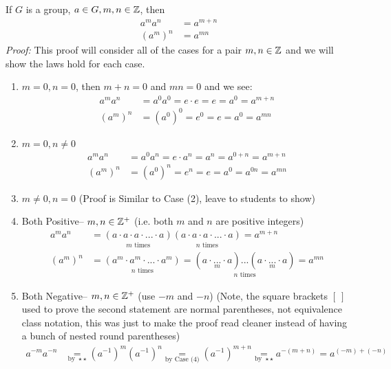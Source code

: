 \begin{proposition}
If $G$ is a group, $a\in G, m,n\in {\mathbb{Z}}$, then
\begin{align}
    a^m a^n&=a^{m+n} \nonumber \\
    (a^m)^n&= a^{mn} \nonumber
\end{align}
\textit{Proof:} This proof will consider all of the cases for a pair $m,n\in {\mathbb{Z}}$ and we will show
the laws hold for each case.
\begin{enumerate}[label=Case \arabic*:]
    \item $m=0,n=0$, then $m+n=0$ and $mn=0$ and we see:
    \begin{align}
        a^ma^n&=a^0a^0=e\cdot e=e=a^0=a^{m+n} \nonumber \\
        (a^m)^n&=(a^0)^0=e^0=e=a^0=a^{mn} \nonumber
    \end{align}
    \item $m=0, n\neq 0$
    \begin{align}
        a^ma^n&=a^0a^n=e\cdot a^n=a^n=a^{0+n}=a^{m+n} \nonumber \\
        (a^m)^n&=(a^0)^n=e^n=e=a^0=a^{0n}=a^{mn} \nonumber
    \end{align}
    \item $m\neq 0, n=0$ (Proof is Similar to Case (2), leave to students to show)
    \item Both Positive-- $m,n\in {\mathbb{Z}}^+$ (i.e. both $m$ and $n$ are positive integers)
    \begin{align}
        a^ma^n&=\underset{m\text{ times}}{(a\cdot a\cdot a \cdot ... \cdot a)}\underset{n \text{ times}}{(a\cdot a\cdot a \cdot ... \cdot a)}=a^{m+n} \nonumber \\
        (a^m)^n&=\underset{n\text{ times}}{(a^m\cdot a^m\cdot ... \cdot a^m)}=\underset{n \text{ times}}{(\underset{m }{a\cdot ... \cdot a})...(\underset{m}{a\cdot ... \cdot a})}=a^{mn}\nonumber
    \end{align}
    \item Both Negative-- $m,n\in {\mathbb{Z}}^+$ (use $-m$ and $-n$) (Note, the square brackets $[\ ]$ used
    to prove the second statement are normal parentheses, not equivalence class notation, this was
    just to make the proof read cleaner instead of having a bunch of nested round parentheses)
    \begin{align}
        a^{-m}a^{-n}& \underset{\text{by }\star\star}{=} (a^{-1})^m(a^{-1})^n \underset{\text{by Case (4)}}{=} (a^{-1})^{m+n} \underset{\text{by }\star\star}{=} a^{-(m+n)}=a^{(-m)+(-n)} \nonumber \\

\end{align}
\end{enumerate}
\end{proposition}
